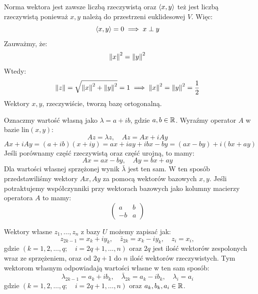 Norma wektora jest zawsze liczbą rzeczywistą oraz $\left\langle x, y \right\rangle$ też jest liczbą rzeczywistą ponieważ $x, y$ należą do przestrzeni euklidesowej $V$. Więc:
\begin{equation}\label{eq:real_vec_orthogonal}
    \left\langle x, y \right\rangle = 0 \implies x \perp y
\end{equation}
Zauważmy, że:
$$ \left\| x \right\|^2 = \left\| y \right\|^2 $$
Wtedy:
\begin{equation}\label{eq:norm_of_real_vec}
    \left\| z \right\| =\sqrt{\left\| x \right\|^2 + \left\| y \right\|^2 } = 1 \implies \left\| x \right\|^2 = \left\| y \right\|^2 = \frac{1}{2} 
\end{equation}
Wektory $x, y$, rzeczywiście, tworzą bazę ortogonalną.

Oznaczmy wartość własną jako $\lambda = a + ib$, gdzie $a, b \in \mathbb{R}$. Wyraźmy operator $A$ w bazie $\mathrm{lin}(x, y)$:
$$ Az = \lambda z, \quad Az = Ax + iAy  $$
$$ Ax + iAy = (a + ib)(x + iy) = ax + iay + ibx - by = (ax - by) + i(bx + ay) $$
Jeśli porównamy część rzeczywistą oraz część urojną, to mamy:
\begin{equation}\label{eq:operator_A_coeffs}
    Ax = ax - by, \quad Ay = bx + ay
\end{equation}
Dla wartości własnej sprzężonej wynik $\bar{\lambda}$ jest ten sam. W ten sposób przedstawiliśmy wektory $Ax, Ay$ za pomocą wektorów bazowych $x, y$. Jeśli potraktujemy współczynniki przy wektorach bazowych jako kolumny macierzy operatora $A$ to mamy:
\begin{equation}\label{eq:real_op_matrix}
\begin{pmatrix}
a & b \\
-b & a
\end{pmatrix}
\end{equation}

Wektory własne $z_1, \ldots, z_n$ z bazy $U$ możemy zapisać jak:
\begin{equation}
    z_{2k-1} = x_k + iy_k, \quad \bar{z}_{2k} = x_k - iy_k, \quad z_{i} = x_i,
\end{equation}
gdzie $(k = 1, 2, \ldots, q;\quad i = 2q + 1, \ldots, n)$ oraz $2q$ jest ilość wektorów zespolonych wraz ze sprzężeniem, oraz od $2q + 1$ do $n$ ilość wektorów rzeczywistych. Tym wektorom własnym odpowiadają wartości własne w ten sam sposób:
\begin{equation}\label{eq:eigenvalues}
    \lambda_{2k-1} = a_k + ib_k, \quad \bar{\lambda}_{2k} = a_k - ib_k, \quad \lambda_{i} = a_i
\end{equation}
gdzie $(k = 1, 2, \ldots, q;\quad i = 2q + 1, \ldots, n)$ oraz $a_k, b_k, a_i \in \mathbb{R}$.

